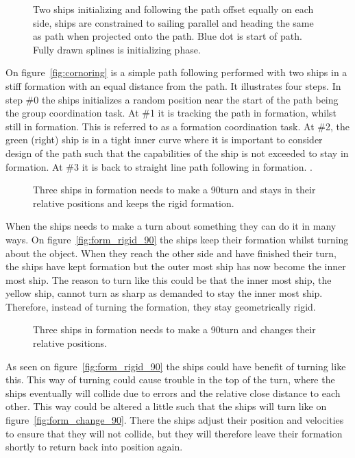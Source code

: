 \begin{figure}[htbp]
	\centering
	
	\caption{Two ships initializing and following the path offset
		equally on each side, ships are constrained to sailing parallel
		and heading the same as path when projected onto the path. Blue
	dot is start of path. Fully drawn splines is initializing phase.}
	\label{fig:cornoring}
\end{figure}

On figure~\vref{fig:cornoring} is a simple path following performed
with two ships in a stiff formation with an equal distance from the
path. It illustrates four steps. In step \#0 the ships initializes a
random position near the start of the path being the group coordination task. At \#1 it is tracking the
path in formation, whilst still in formation. This is referred to as a formation coordination task. At \#2, the green
(right) ship is in a tight inner curve where it is important to
consider design of the path such that the capabilities of the ship is not
exceeded to stay in formation. At \#3 it is back to straight line path
following in formation. \citep{thorvaldsen}.

\begin{figure}[htbp]
	\centering
	
	\caption{Three ships in formation needs to make a 90\textdegree turn and stays in their relative positions and keeps the rigid formation.}
	\label{fig:form_rigid_90}
\end{figure}

When the ships needs to make a turn about something they can do it in many ways. On figure~\vref{fig:form_rigid_90} the ships keep their formation whilst turning about the object. When they reach the other side and have finished their turn, the ships have kept formation but the outer most ship has now become the inner most ship. The reason to turn like this could be that the inner most ship, the yellow ship, cannot turn as sharp as demanded to stay the inner most ship. Therefore, instead of turning the formation, they stay geometrically rigid.

\begin{figure}[htbp]
	\centering
	
	\caption{Three ships in formation needs to make a 90\textdegree turn and changes their relative positions.}
	\label{fig:form_change_90}
\end{figure}

As seen on figure~\vref{fig:form_rigid_90} the ships could have benefit of turning like this. This way of turning could cause trouble in the top of the turn, where the ships eventually will collide due to errors and the relative close distance to each other. This way could be altered a little such that the ships will turn like on figure~\vref{fig:form_change_90}. There the ships adjust their position and velocities to ensure that they will not collide, but they will therefore leave their formation shortly to return back into position again.

